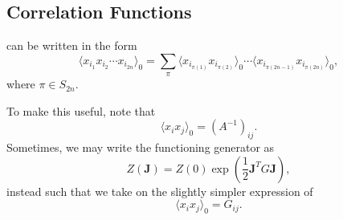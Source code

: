 \documentclass{article}
\numberwithin{equation}{section}
\begin{document}
\subsection{Correlation Functions}
\begin{theorem}
     can be written in the form 
    \begin{equation}
        \langle x_{i_1}x_{i_2}\cdots x_{i_{2n}}\rangle_0 = \sum_\pi \langle x_{i_{\pi(1)}}x_{i_{\pi(2)}}\rangle_0  \cdots \langle x_{i_{\pi(2n-1)}}x_{i_{\pi(2n)}}\rangle_0,
    \end{equation}
    where $\pi \in S_{2n}.$
\end{theorem}
To make this useful, note that 
\begin{equation}
    \boxed{\langle x_ix_j\rangle_0 = (A^{-1})_{ij}.}
\end{equation}
Sometimes, we may write the functioning generator as 
\begin{equation}
    Z(\bm{J}) = Z(0)\exp\left(\frac{1}{2}\bm{J}^TG\bm{J}\right),
\end{equation}
instead such that we take on the slightly simpler expression of 
\begin{equation}
    \langle x_ix_j\rangle_0 = G_{ij}.
\end{equation}
\end{document}
